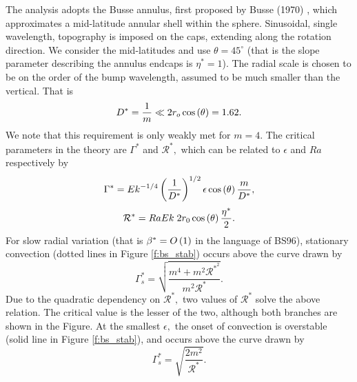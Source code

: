 The analysis adopts the Busse annulus, first proposed by Busse (1970) \citep{fB70}, which approximates a mid-latitude annular shell within the sphere. Sinusoidal, single wavelength, topography is imposed on the caps, extending along the rotation direction. 
We consider the mid-latitudes and use $\theta = 45^{\circ}$ (that is the slope parameter describing the annulus endcaps is $\eta^{*}=1$). 
The radial scale is chosen to be on the order of the bump wavelength, assumed to be much smaller than the vertical. That is
\[D^{*}= \frac{1}{m}\ll 2 r_o \cos\left (\theta\right ) = 1.62.\]
We note that this requirement is only weakly met for $m = 4.$
The critical parameters in the theory are $\Gamma^{*} $ and $\mathcal{R}^{*},$ which can be related to $\epsilon$ and $Ra$ respectively by
 \[\Gamma^{*} =  Ek^{-1/4} \left (\frac{1}{D^{*}}\right )^{1/2}\epsilon\cos\left (\theta\right ) \frac{m}{D^{*}},\]
 \[\mathcal{R}^{*} = Ra Ek \;2r_{0}\cos\left (\theta\right )\frac{\eta^{*}}{2}.\] 
For slow radial variation (that is $\beta^{*}=O\left (1\right )$ in the language of BS96), stationary convection (dotted lines in Figure \ref{f:bs_stab}) occurs above the curve drawn by 
\[\Gamma_{s}^{*} = \sqrt{\frac{m^{4} + m^{2} \mathcal{R}^{*^2}}{m^{2}\mathcal R^{*}}}.\]
Due to the quadratic dependency on $\mathcal{R}^{*},$ two values of $\mathcal{R}^{*}$ solve the above relation. The critical value is the lesser of the two, although both branches are shown in the Figure.
 At the smallest $\epsilon,$ the onset of convection is overstable (solid line in Figure \ref{f:bs_stab}), and occurs above the curve drawn by
 \[\Gamma_{s}^{*} = \sqrt{\frac{2 m^{2}}{\mathcal{R}^{*}}}.\]
